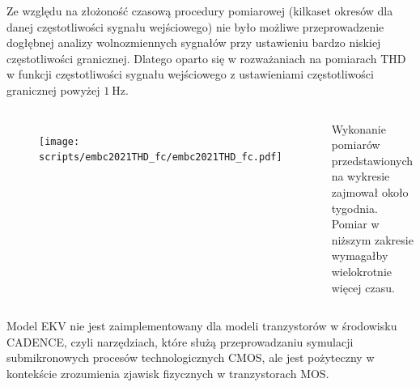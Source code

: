 \begin{frame}[t]
    \begin{block}{\tb}
    \end{block}
    Ze względu na złożoność czasową procedury pomiarowej (kilkaset okresów dla danej częstotliwości sygnału wejściowego) nie było możliwe przeprowadzenie dogłębnej analizy wolnozmiennych sygnałów przy ustawieniu bardzo niskiej częstotliwości granicznej.
    Dlatego oparto się w rozważaniach na pomiarach THD w funkcji częstotliwości sygnału wejściowego z ustawieniami częstotliwości granicznej powyżej $\SI{1}{\hertz}$.
    
    \begin{columns}

        \begin{figure}[H]
            \centering
            \texttt{[image: scripts/embc2021THD\_fc/embc2021THD\_fc.pdf]}  
        \end{figure}
    
            Wykonanie pomiarów przedstawionych na wykresie zajmował około tygodnia. 
            Pomiar w niższym zakresie wymagałby wielokrotnie więcej czasu. 
    \end{columns}


\end{frame}
\begin{frame}[t]
    \begin{block}{\tb}
    \end{block}


    Model EKV nie jest zaimplementowany dla modeli tranzystorów w środowisku CADENCE, czyli narzędziach, które służą przeprowadzaniu symulacji submikronowych procesów technologicznych CMOS, ale jest pożyteczny w kontekście zrozumienia zjawisk fizycznych w tranzystorach MOS. 
\end{frame}

